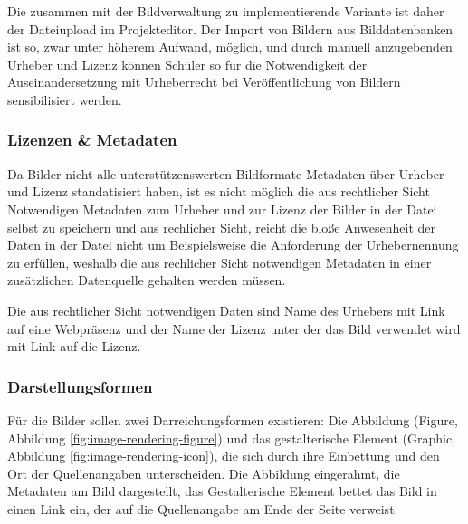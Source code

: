 Die zusammen mit der Bildverwaltung zu implementierende Variante ist daher der
Dateiupload im Projekteditor. Der Import von Bildern aus Bilddatenbanken ist so,
zwar unter höherem Aufwand, möglich, und durch manuell anzugebenden Urheber und
Lizenz können Schüler so für die Notwendigkeit der Auseinandersetzung mit
Urheberrecht bei Veröffentlichung von Bildern sensibilisiert werden.

\subsubsection{Lizenzen \& Metadaten}

Da Bilder nicht alle unterstützenswerten Bildformate Metadaten über
Urheber und Lizenz standatisiert haben, ist es nicht möglich die aus
rechtlicher Sicht Notwendigen Metadaten zum Urheber und zur Lizenz der Bilder
in der Datei selbst zu speichern und aus rechlicher Sicht, reicht die bloße
Anwesenheit der Daten in der Datei nicht um Beispielsweise die Anforderung der
Urhebernennung zu erfüllen, weshalb die aus rechlicher Sicht notwendigen
Metadaten in einer zusätzlichen Datenquelle gehalten werden müssen.

Die aus rechtlicher Sicht notwendigen Daten sind Name des Urhebers mit Link auf
eine Webpräsenz und der Name der Lizenz unter der das Bild verwendet wird
mit Link auf die Lizenz.

\subsubsection{Darstellungsformen}

Für die Bilder sollen zwei Darreichungsformen existieren: Die Abbildung
(Figure, Abbildung \ref{fig:image-rendering-figure}) und das gestalterische
Element (Graphic, Abbildung \ref{fig:image-rendering-icon}), die sich durch ihre
Einbettung und den Ort der Quellenangaben unterscheiden. Die Abbildung
eingerahmt, die Metadaten am Bild dargestellt, das Gestalterische Element bettet
das Bild in einen Link ein, der auf die Quellenangabe am Ende der Seite
verweist.

